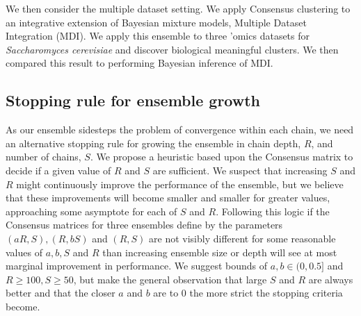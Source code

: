 \documentclass[]{article}
\begin{document}
We then consider the multiple dataset setting. We apply Consensus clustering to an integrative extension of Bayesian mixture models, Multiple Dataset Integration (MDI). We apply this ensemble to three 'omics datasets for \emph{Saccharomyces cerevisiae} and discover biological meaningful clusters. We then compared this result to performing Bayesian inference of MDI.


\subsection{Stopping rule for ensemble growth} \label{sec:stopping}
As our ensemble sidesteps the problem of convergence within each chain, we need an alternative stopping rule for growing the ensemble in chain depth, $R$, and number of chains, $S$. We propose a heuristic based upon the Consensus matrix to decide if a given value of $R$ and $S$ are sufficient. We suspect that increasing $S$ and $R$ might continuously improve the performance of the ensemble, but we believe that these improvements will become smaller and smaller for greater values, approaching some asymptote for each of $S$ and $R$. Following this logic if the Consensus matrices for three ensembles define by the parameters $(aR, S), (R, bS)$ and $(R, S)$ are not visibly different for some reasonable values of $a, b, S$ and $R$ than increasing ensemble size or depth will see at most marginal improvement in performance. We suggest bounds of $a, b \in (0, 0.5]$ and $R \geq 100, S \geq 50$, but make the general observation that large $S$ and $R$ are always better and that the closer $a$ and $b$ are to 0 the more strict the stopping criteria become.

\end{document}
